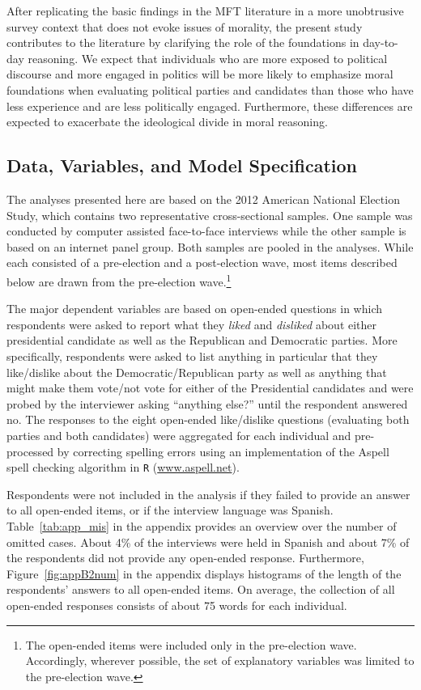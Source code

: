 \documentclass[12pt]{article}
\begin{document}
After replicating the basic findings in the MFT literature in a more unobtrusive survey context that does not evoke issues of morality, the present study contributes to the literature by clarifying the role of the foundations in day-to-day reasoning. We expect that individuals who are more exposed to political discourse and more engaged in politics will be more likely to emphasize moral foundations when evaluating political parties and candidates than those who have less experience and are less politically engaged. Furthermore, these differences are expected to exacerbate the ideological divide in moral reasoning.


\subsection{Data, Variables, and Model Specification}

The analyses presented here are based on the 2012 American National Election Study, which contains two representative cross-sectional samples. One sample was conducted by computer assisted face-to-face interviews while the other sample is based on an internet panel group. Both samples are pooled in the analyses. While each consisted of a pre-election and a post-election wave, most items described below are drawn from the pre-election wave.\footnote{The open-ended items were included only in the pre-election wave. Accordingly, wherever possible, the set of explanatory variables was limited to the pre-election wave.}

The major dependent variables are based on open-ended questions in which respondents were asked to report what they \textit{liked} and \textit{disliked} about either presidential candidate as well as the Republican and Democratic parties. More specifically, respondents were asked to list anything in particular that they like/dislike about the Democratic/Republican party as well as anything that might make them vote/not vote for either of the Presidential candidates and were probed by the interviewer asking ``anything else?'' until the respondent answered no. The responses to the eight open-ended like/dislike questions (evaluating both parties and both candidates) were aggregated for each individual and pre-processed by correcting spelling errors using an implementation of the Aspell spell checking algorithm in \texttt{R} (\url{www.aspell.net}).

Respondents were not included in the analysis if they failed to provide an answer to all open-ended items, or if the interview language was Spanish. Table~\ref{tab:app_mis} in the appendix provides an overview over the number of omitted cases. About 4\% of the interviews were held in Spanish and about 7\% of the respondents did not provide any open-ended response. Furthermore, Figure~\ref{fig:appB2num} in the appendix displays histograms of the length of the respondents' answers to all open-ended items. On average, the collection of all open-ended responses consists of about 75 words for each individual.
\end{document}

